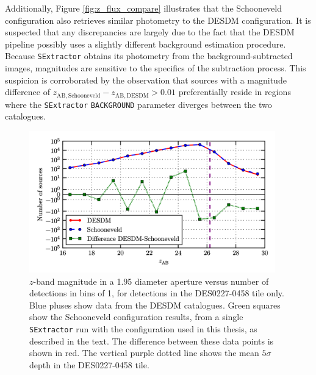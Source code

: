 Additionally, Figure \ref{fig:z_flux_compare} illustrates that the Schooneveld configuration also retrieves similar photometry to the DESDM configuration. It is suspected that any discrepancies are  largely due to the fact that the DESDM pipeline possibly uses a slightly different background estimation procedure. Because \texttt{SExtractor} obtains its photometry from the background-subtracted images, magnitudes are sensitive to the specifics of the subtraction process. This suspicion is corroborated by the observation that sources with a magnitude difference of $z_{\mathrm{AB,Schooneveld}}-z_{\mathrm{AB,DESDM}}>0.01$ preferentially reside in regions where the \texttt{SExtractor} \texttt{BACKGROUND} parameter diverges between the two catalogues. \par 

\begin{figure}[h] 
\centering    
\includegraphics[width=0.95\textwidth]{z_flux_histogram.png}
\caption[Verification of the photometry method: number of source detections]{$z$-band magnitude in a \SI{1.95}{\arcsec} diameter aperture versus number of detections in bins of \SI{1}{\mag}, for detections in the DES0227-0458 tile only. Blue pluses show data from the DESDM catalogues. Green squares show the Schooneveld configuration results, from a single \texttt{SExtractor} run with the \DESVIDEO configuration used in this thesis, as described in the text. The difference between these data points is shown in red. The vertical purple dotted line shows the mean $5\sigma$ depth in the DES0227-0458 tile.}
\label{fig:z_flux_histogram}
\end{figure}


